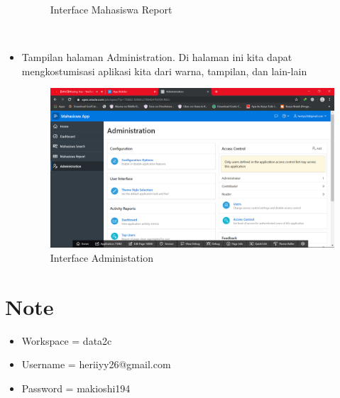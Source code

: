 \documentclass[12pt, times new roman]{article}
\begin{document}
\begin{itemize}
\begin{figure}[htbp]
	\caption{Interface Mahasiswa Report}
\end{figure}\\
\item Tampilan halaman Administration. Di halaman ini kita dapat mengkostumisasi aplikasi kita dari warna, tampilan, dan lain-lain
\begin{figure}[htbp]
	\centering
	\includegraphics[width=12cm]{figures/31.png}
	\caption{Interface Administation}
\end{figure}
\end{itemize}
\section{Note}
\begin{itemize}
\item Workspace = data2c
\item Username = heriiyy26@gmail.com
\item Password = makioshi194
\end{itemize}
\end{document}
